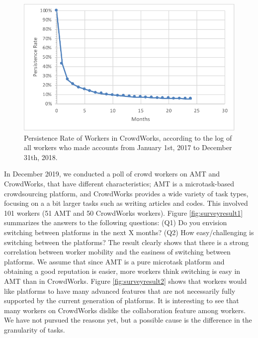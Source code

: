  \begin{figure}
    \centering
     \includegraphics{figures/persistenceRateCrowdworks.pdf}
     \caption{Persistence Rate of Workers in CrowdWorks, according to the log of all workers who made accounts from January 1st, 2017 to December 31th, 2018.
     }
     \label{fig:persistenceRate}
 \end{figure}

In December 2019, we conducted a poll of crowd workers on AMT and CrowdWorks, that have different characteristics; AMT is a microtask-based crowdsourcing platform, and CrowdWorks provides a wide variety of task types, focusing on a a bit larger tasks such as writing articles and codes.
This involved 101 workers (51 AMT and 50 CrowdWorks workers).
 Figure \ref{fig:surveyresult1}  summarizes the answers to the following questions: (Q1) Do you envision switching between platforms in the next X months? (Q2) How easy/challenging is switching between the platforms? 
 The result clearly shows that there is a strong correlation between worker mobility and the easiness of switching between platforms.
 We assume that since AMT is a pure microtask platform and obtaining a good reputation is easier, more workers think switching is easy in AMT than in CrowdWorks.
 Figure \ref{fig:surveyresult2} shows that workers would like platforms to have many advanced features that are not necessarily fully supported by the current generation of platforms. It is interesting to see that many workers on CrowdWorks dislike the collaboration feature among workers. We have not pursued the reasons yet, but a possible cause is the difference in the granularity of tasks. 

